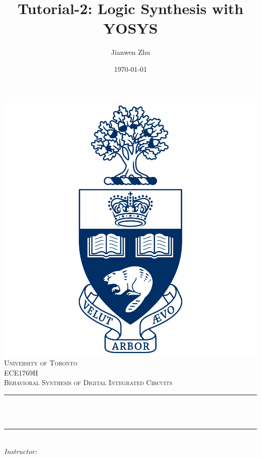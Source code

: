 \documentclass[12pt]{article}
\title{Tutorial-2: Logic Synthesis with YOSYS}								%
\author{Jianwen Zhu}								%
\date{\today}											%
\makeatletter
\newcommand{\course} {ECE1769H}
\let\thetitle\@title
\let\theauthor\@author
\makeatother
\begin{document}

\begin{titlepage}
	\centering
    \vspace*{0.5 cm}
    \includegraphics[scale = 0.12]{UofT.png}\\[1.0 cm]	%
    \textsc{\LARGE University of Toronto}\\[2.0 cm]	%
	\textsc{\Large \course}\\[0.5 cm]				%
	\textsc{\large Behavioral Synthesis of Digital Integrated Circuits}\\[0.5 cm]				%
	\rule{\linewidth}{0.2 mm} \\[0.4 cm]
	{ \huge \bfseries \thetitle}\\
	\rule{\linewidth}{0.2 mm} \\[1.5 cm]
	
		\large
			\emph{Instructor:}\\
			\theauthor 
			
 
	\vfill
	
\end{titlepage}
\end{document}
